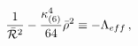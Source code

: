 \begin{equation}\label{eff}
{1\over {\bar{\cal R}^2}} - {{\kappa_{(6)} ^4} \over {64}} \bar\rho ^2
\equiv -\Lambda_{eff} \, ,
\end{equation}

